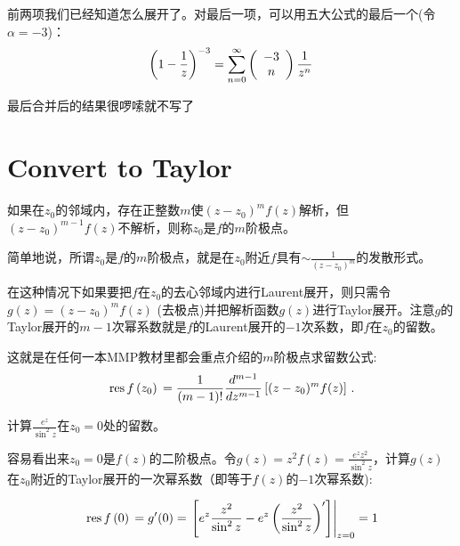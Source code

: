 \documentclass[CJK]{beamer}
\begin{document}
\begin{frame}
  \bch
  前两项我们已经知道怎么展开了。对最后一项，可以用五大公式的最后一个(令$\alpha=-3$)：
  $$  \left(1-\frac{1}{z}\right)^{-3} = \sum_{n=0}^\infty \left(\begin{array}{c}-3\\ n\end{array}\right)\frac{1}{z^n}$$
  
  \bye 最后合并后的结果很啰嗦就不写了
  \ech
\end{frame}

\section{Convert to Taylor}

\begin{frame}
  \bch
          {\blue  如果在$z_0$的邻域内，存在正整数$m$使$(z-z_0)^mf(z)$解析，但$(z-z_0)^{m-1}f(z)$不解析，则称$z_0$是$f$的$m$阶极点。}

          \skiplines

          简单地说，所谓$z_0$是$f$的$m$阶极点，就是在$z_0$附近$f$具有$\sim \frac{1}{(z-z_0)^m}$的发散形式。

          \skiplines
          
          在这种情况下如果要把$f$在$z_0$的去心邻域内进行Laurent展开，则只需令$g(z) = (z-z_0)^mf(z)$ (去极点)并把解析函数$g(z)$进行Taylor展开。注意$g$的Taylor展开的$m-1$次幂系数就是$f$的Laurent展开的$-1$次系数，即$f$在$z_0$的留数。

            这就是在任何一本MMP教材里都会重点介绍的{\blue $m$阶极点求留数公式:
            $$\,\mathrm{res}\,f\left(z_0\right)\, = \frac{1}{(m-1)!}\frac{d^{m-1}}{dz^{m-1}} \left[(z-z_0)^mf(z)\right] \, .$$
        }
          \ech
\end{frame}

\begin{frame}
  \bch
  
  计算$\frac{e^z}{\sin^2 z}$在$z_0=0$处的留数。
  \ech
\end{frame}

\begin{frame}
  \bch
  容易看出来$z_0=0$是$f(z)$的二阶极点。令$g(z) = z^2 f(z) = \frac{e^zz^2}{\sin^2 z}$，计算$g(z)$在$z_0$附近的Taylor展开的一次幂系数（即等于$f(z)$的$-1$次幂系数):

    $$\,\mathrm{res}\,f\left(0\right)\, = g'(0) =\left.\left[ e^z\frac{z^2}{\sin^2z} - e^z\left(\frac{z^2}{\sin^2z}\right)'\right]\right\vert_{z=0} = 1$$

    
  \ech
\end{frame}
\end{document}
